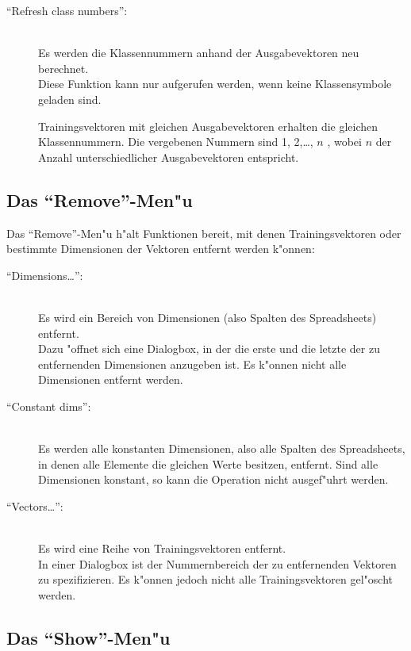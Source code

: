 \begin{description}
\item["`Refresh class numbers"':] \mbox{} \\
Es werden die Klassennummern anhand der Ausgabevektoren neu berechnet. \\ 
Diese Funktion kann nur aufgerufen werden, wenn keine Klassensymbole geladen
sind.

Trainingsvektoren mit gleichen Ausgabevektoren erhalten die gleichen
Klassennummern.
Die vergebenen Nummern sind 1, 2,\ldots, $n$ , wobei $n$ 
der Anzahl unterschiedlicher Ausgabevektoren entspricht.
\end{description}
 
\subsection{Das "`Remove"'-Men"u}

Das "`Remove"'-Men"u h"alt Funktionen bereit, mit denen Trainingsvektoren
oder bestimmte Dimensionen der Vektoren entfernt werden k"onnen:

\begin{description}
\item["`Dimensions\ldots"':] \mbox{} \\
Es wird ein Bereich von Dimensionen (also Spalten des Spreadsheets) entfernt. \\
Dazu "offnet sich eine Dialogbox, in der die erste und die letzte der
zu entfernenden Dimensionen anzugeben ist.
Es k"onnen nicht alle Dimensionen entfernt werden.

\item["`Constant dims"':] \mbox{} \\
Es werden alle konstanten Dimensionen, also alle Spalten des
Spread\-sheets, 
in denen alle Elemente die gleichen Werte besitzen, entfernt.
Sind alle Dimensionen konstant, so kann die Operation nicht
ausgef"uhrt werden.

\item["`Vectors\ldots"':] \mbox{} \\
Es wird eine Reihe von Trainingsvektoren entfernt. \\
In einer Dialogbox ist der Nummernbereich der zu entfernenden Vektoren
zu spezifizieren.
Es k"onnen jedoch nicht alle Trainingsvektoren gel"oscht werden.
\end{description}

\subsection{Das "`Show"'-Men"u} 

